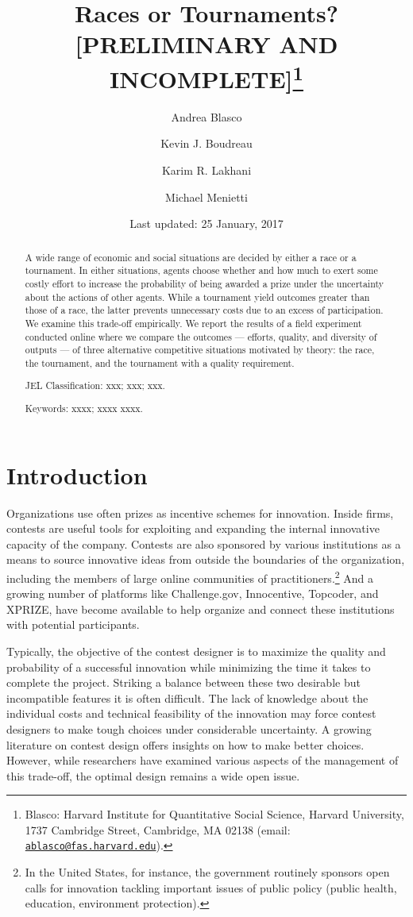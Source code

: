 \documentclass[12pt,]{article}
\title{Races or Tournaments? {[}PRELIMINARY AND INCOMPLETE{]}\thanks{Blasco: Harvard Institute for Quantitative Social Science, Harvard
University, 1737 Cambridge Street, Cambridge, MA 02138 (email:
\href{mailto:ablasco@fas.harvard.edu}{\nolinkurl{ablasco@fas.harvard.edu}}).}}
\author{Andrea Blasco \and Kevin J. Boudreau \and Karim R. Lakhani \and Michael Menietti}
\date{Last updated: 25 January, 2017}
\begin{document}
\maketitle
\begin{abstract}
A wide range of economic and social situations are decided by either a
race or a tournament. In either situations, agents choose whether and
how much to exert some costly effort to increase the probability of
being awarded a prize under the uncertainty about the actions of other
agents. While a tournament yield outcomes greater than those of a race,
the latter prevents unnecessary costs due to an excess of participation.
We examine this trade-off empirically. We report the results of a field
experiment conducted online where we compare the outcomes --- efforts,
quality, and diversity of outputs --- of three alternative competitive
situations motivated by theory: the race, the tournament, and the
tournament with a quality requirement.

\smallskip\noindent 
JEL Classification: xxx; xxx; xxx.

\smallskip\noindent 
Keywords: xxxx; xxxx xxxx.
\end{abstract}


\clearpage
\tableofcontents
\setcounter{tocdepth}{2}
\clearpage

\section{Introduction}\label{introduction}

Organizations use often prizes as incentive schemes for innovation.
Inside firms, contests are useful tools for exploiting and expanding the
internal innovative capacity of the company. Contests are also sponsored
by various institutions as a means to source innovative ideas from
outside the boundaries of the organization, including the members of
large online communities of practitioners.\footnote{In the United
  States, for instance, the government routinely sponsors open calls for
  innovation tackling important issues of public policy (public health,
  education, environment protection).} And a growing number of platforms
like Challenge.gov, Innocentive, Topcoder, and XPRIZE, have become
available to help organize and connect these institutions with potential
participants.

Typically, the objective of the contest designer is to maximize the
quality and probability of a successful innovation while minimizing the
time it takes to complete the project. Striking a balance between these
two desirable but incompatible features it is often difficult. The lack
of knowledge about the individual costs and technical feasibility of the
innovation may force contest designers to make tough choices under
considerable uncertainty. A growing literature on contest design offers
insights on how to make better choices. However, while researchers have
examined various aspects of the management of this trade-off, the
optimal design remains a wide open issue.
\end{document}
